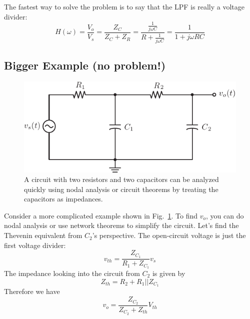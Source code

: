The fastest way to solve the problem is to say that the LPF is really a voltage divider:
    \begin{equation}
        H(\omega ) = \frac{{{V_o}}}{{{V_s}}} = \frac{{{Z_C}}}{{{Z_C} + {Z_R}}} = \frac{{\frac{1}{{j\omega C}}}}{{R + \frac{1}{{j\omega C}}}} = \frac{1}{{1 + j\omega RC}}
    \end{equation}
\subsection{Bigger Example (no problem!)}
\begin{figure}[tb]
\begin{center}
\includegraphics[angle=-0.0,scale=1]{mod1_3_7_rc_lpf2}
\end{center}
\caption{A circuit with two resistors and two capacitors can be analyzed quickly using nodal analysis or circuit theorems by treating the capacitors as impedances.}
\label{fig:bigexample}
\end{figure}
Consider a more complicated example shown in Fig.~\ref{fig:bigexample}.  To find $v_o$, you can do nodal analysis or use network theorems to simplify the circuit.  Let's find the Thevenin equivalent from $C_2$'s perspective.  The open-circuit voltage is just the first voltage divider:
    \begin{equation}
        v_{th} = \frac{Z_{C_1}}{R_1 + Z_{C_1}} v_s 
    \end{equation}
The impedance looking into the circuit from $C_2$ is given by
    \begin{equation}
        Z_{th} = R_2 + R_1 || Z_{C_1}
    \end{equation}
Therefore we have  
    \begin{equation}
        v_o = \frac{Z_{C_2}}{Z_{C_2} + Z_{th}} V_{th} 
    \end{equation}
